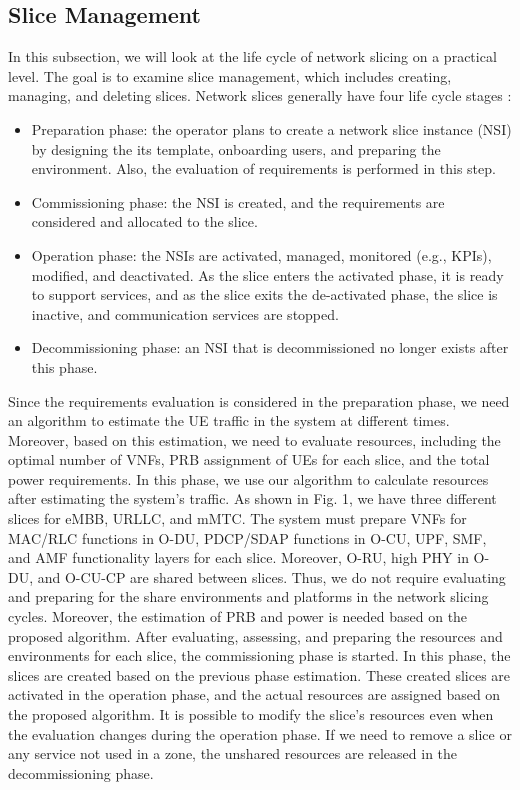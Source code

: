 \documentclass[lettersize,journal]{IEEEtran}
\begin{document}
\subsection{Slice Management}
\vspace{-1mm}
In this subsection, we will look at the life cycle of network slicing on a practical level. 
The goal is to examine slice management, which includes creating, managing, and deleting slices. Network slices generally have four life cycle stages \cite{ETSI2}:
\begin{itemize}
\item Preparation phase: the operator plans to create a network slice instance (NSI) by designing the its template, onboarding users, and preparing the environment. Also, the evaluation of requirements is performed in this step.
\item Commissioning phase: the NSI is created, and the requirements are considered and allocated to the slice.
\item Operation phase: the NSIs are activated, managed, monitored (e.g., KPIs), modified, and deactivated. As the slice enters the activated phase, it is ready to support services, and as the slice exits the de-activated phase, the slice is inactive, and communication services are stopped.
\item Decommissioning phase: an NSI that is decommissioned no longer exists after this phase.
\end{itemize}
Since the requirements evaluation is considered in the preparation phase, we need an algorithm to estimate the UE traffic in the system at different times. Moreover, based on this estimation, we need to evaluate resources, including the optimal number of VNFs, PRB assignment of UEs for each slice, and the total power requirements. In this phase, we use our algorithm to calculate resources after estimating the system's traffic.
As shown in Fig. 1, we have three different slices for eMBB, URLLC, and mMTC. The system must prepare VNFs for MAC/RLC functions in O-DU, PDCP/SDAP functions in O-CU, UPF, SMF, and AMF functionality layers for each slice. Moreover, O-RU, high PHY in O-DU, and O-CU-CP are shared between slices. Thus, we do not require evaluating and preparing for the share environments and platforms in the network slicing cycles. Moreover, the estimation of PRB and power is needed based on the proposed algorithm. 
After evaluating, assessing, and preparing the resources and environments for each slice, the commissioning phase is started. In this phase, the slices are created based on the previous phase estimation. These created slices are activated in the operation phase, and the actual resources are assigned based on the proposed algorithm.
It is possible to modify the slice's resources even when the evaluation changes during the operation phase. 
If we need to remove a slice or any service not used in a zone, the unshared resources are released in the decommissioning phase.
\vspace{-3mm}
\end{document}
